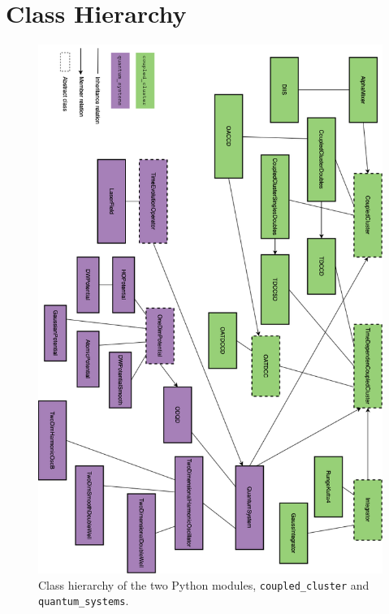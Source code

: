 \chapter{Class Hierarchy}
\label{app:class_diagram}

\begin{figure}
    \centering
    \includegraphics[width=\textwidth]{ramblings/taifun_class_diagram.png} 
    \caption{Class hierarchy of the two Python modules, \lstinline{coupled_cluster}
    and \lstinline{quantum_systems}.}
\end{figure}